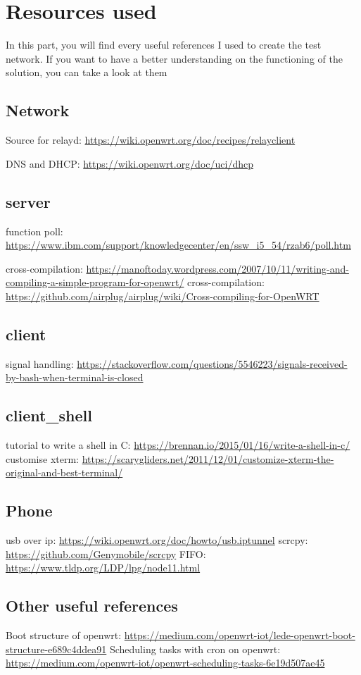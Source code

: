 \chapter{Resources used}

In this part, you will find every useful references I used to create the test network. If you want to have a better understanding on the functioning of the solution, you can take a look at them

\section{Network}
Source for relayd: \url{https://wiki.openwrt.org/doc/recipes/relayclient}

DNS and DHCP: \url{https://wiki.openwrt.org/doc/uci/dhcp}

\section{server}


function poll: \url{https://www.ibm.com/support/knowledgecenter/en/ssw\_i5\_54/rzab6/poll.htm}

cross-compilation: \url{https://manoftoday.wordpress.com/2007/10/11/writing-and-compiling-a-simple-program-for-openwrt/}
cross-compilation: \url{https://github.com/airplug/airplug/wiki/Cross-compiling-for-OpenWRT}


\section{client}

signal handling: \url{https://stackoverflow.com/questions/5546223/signals-received-by-bash-when-terminal-is-closed}


\section{client\_shell}

tutorial to write a shell in C: \url{https://brennan.io/2015/01/16/write-a-shell-in-c/}
customise xterm: \url{https://scarygliders.net/2011/12/01/customize-xterm-the-original-and-best-terminal/}



\section{Phone}

usb over ip: \url{https://wiki.openwrt.org/doc/howto/usb.iptunnel}
scrcpy: \url{https://github.com/Genymobile/scrcpy}
FIFO: \url{https://www.tldp.org/LDP/lpg/node11.html}



\section{Other useful references}
Boot structure of openwrt: \url{https://medium.com/openwrt-iot/lede-openwrt-boot-structure-e689c4ddea91}
Scheduling tasks with cron on openwrt: \url{https://medium.com/openwrt-iot/openwrt-scheduling-tasks-6e19d507ae45}